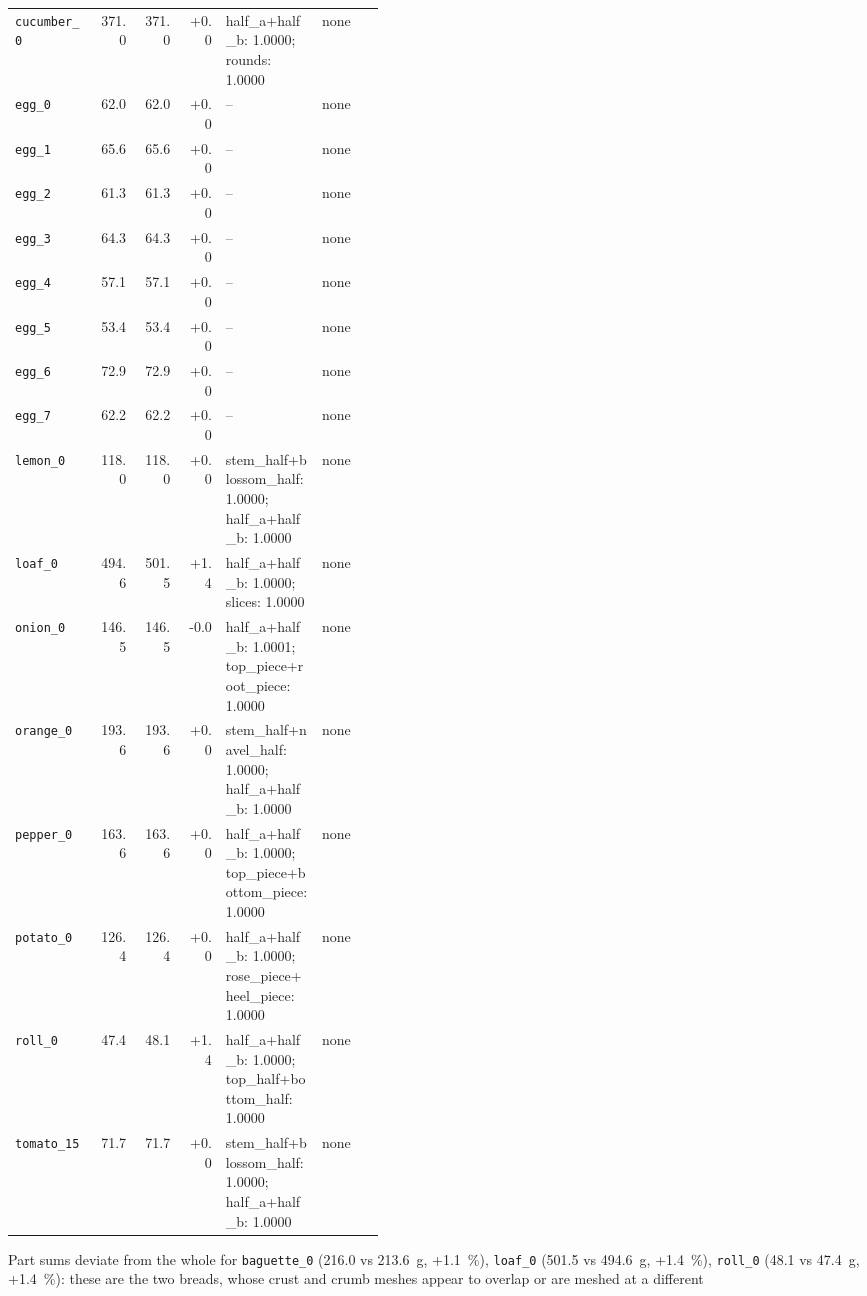 \documentclass[10.5pt,a4paper]{article}
\begin{document}
{\begin{longtable}{@{}lrrrp{0.26\linewidth}p{0.17\linewidth}@{}}
\texttt{cucumber\_\allowbreak{}0} & 371.0 & 371.0 & +0.0 & half\_a+half\_b: 1.0000; rounds: 1.0000 & none \\
\texttt{egg\_\allowbreak{}0} & 62.0 & 62.0 & +0.0 & -- & none \\
\texttt{egg\_\allowbreak{}1} & 65.6 & 65.6 & +0.0 & -- & none \\
\texttt{egg\_\allowbreak{}2} & 61.3 & 61.3 & +0.0 & -- & none \\
\texttt{egg\_\allowbreak{}3} & 64.3 & 64.3 & +0.0 & -- & none \\
\texttt{egg\_\allowbreak{}4} & 57.1 & 57.1 & +0.0 & -- & none \\
\texttt{egg\_\allowbreak{}5} & 53.4 & 53.4 & +0.0 & -- & none \\
\texttt{egg\_\allowbreak{}6} & 72.9 & 72.9 & +0.0 & -- & none \\
\texttt{egg\_\allowbreak{}7} & 62.2 & 62.2 & +0.0 & -- & none \\
\texttt{lemon\_\allowbreak{}0} & 118.0 & 118.0 & +0.0 & stem\_half+blossom\_half: 1.0000; half\_a+half\_b: 1.0000 & none \\
\texttt{loaf\_\allowbreak{}0} & 494.6 & 501.5 & +1.4 & half\_a+half\_b: 1.0000; slices: 1.0000 & none \\
\texttt{onion\_\allowbreak{}0} & 146.5 & 146.5 & -0.0 & half\_a+half\_b: 1.0001; top\_piece+root\_piece: 1.0000 & none \\
\texttt{orange\_\allowbreak{}0} & 193.6 & 193.6 & +0.0 & stem\_half+navel\_half: 1.0000; half\_a+half\_b: 1.0000 & none \\
\texttt{pepper\_\allowbreak{}0} & 163.6 & 163.6 & +0.0 & half\_a+half\_b: 1.0000; top\_piece+bottom\_piece: 1.0000 & none \\
\texttt{potato\_\allowbreak{}0} & 126.4 & 126.4 & +0.0 & half\_a+half\_b: 1.0000; rose\_piece+heel\_piece: 1.0000 & none \\
\texttt{roll\_\allowbreak{}0} & 47.4 & 48.1 & +1.4 & half\_a+half\_b: 1.0000; top\_half+bottom\_half: 1.0000 & none \\
\texttt{tomato\_\allowbreak{}15} & 71.7 & 71.7 & +0.0 & stem\_half+blossom\_half: 1.0000; half\_a+half\_b: 1.0000 & none \\\bottomrule\end{longtable}}
Part sums deviate from the whole for \texttt{baguette\_\allowbreak{}0} (216.0 vs 213.6~g, +1.1~\%), \texttt{loaf\_\allowbreak{}0} (501.5 vs 494.6~g, +1.4~\%), \texttt{roll\_\allowbreak{}0} (48.1 vs 47.4~g, +1.4~\%): these are the two breads, whose crust and crumb meshes appear to overlap or are meshed at a different
\end{document}
